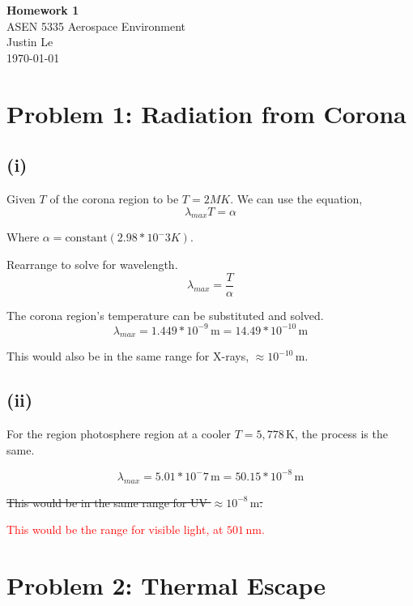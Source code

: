 \documentclass[11pt]{article}
\begin{document}
\begin{center}
    {\Large \textbf{Homework 1}}\\[0.5em]
    {\large ASEN 5335 Aerospace Environment}\\[0.5em]
    Justin Le\\ 
    \today
    \\[0.5em]
\end{center}

\vspace{1em}

\section*{Problem 1: Radiation from Corona}

\subsection*{(i)}

Given $T$ of the corona region to be $T=2MK$. We can use the equation,
\[
\lambda_{max}T = \alpha
\]

Where $\alpha = \text{constant}(2.98*10^-3 K)$.

Rearrange to solve for wavelength.
\[
\lambda_{max} = \frac{T}{\alpha}
\]

The corona region's temperature can be substituted and solved.
\[
\boxed{\lambda_{max}  = 1.449*10^{-9} \, \mathrm{m} = 14.49*10^{-10} \, \mathrm{m}}
\]

This would also be in the same range for X-rays, $\approx 10^{-10} \, \mathrm{m}$.

\subsection*{(ii)}
For the region photosphere region at a cooler $T=5,778 \, \mathrm{K}$,
the process is the same.

\[
\boxed{\lambda_{max}  = 5.01*10^-7 \, \mathrm{m} = 50.15*10^{-8} \, \mathrm{m}}
\]


\sout{This would be in the same range for UV $\approx 10^{-8} \, \mathrm{m}$.}

\textcolor{red}{This would be the range for visible light, at $501 \, \mathrm{nm}$.}

\section*{Problem 2: Thermal Escape}
\end{document}
